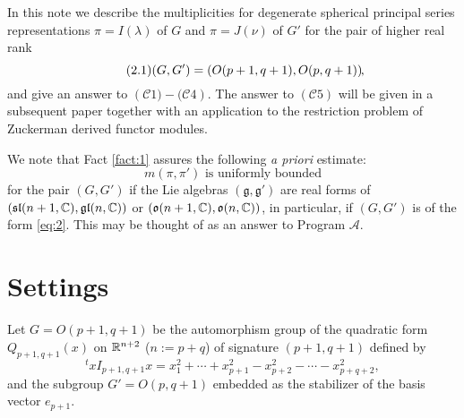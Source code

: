 \documentclass[reqno,12pt]{pja00} %
\theoremstyle{definition}
\theoremstyle{exampstyle} \newtheorem{examp}[theorem]{Theorem}
\newcommand{\tmtextbf}[1]{{\bfseries{#1}}}
\begin{document}

In this note we describe the multiplicities for degenerate spherical principal series representations $\pi=I(\lambda)$ of $G$ and $\pi=J(\nu)$ of $G'$ for the pair
of higher real rank\begin{equation}\tag{2.1}\label{eq:2}
	(G,G')=\left( O(p+1,q+1),O(p,q+1) \right)\kern-0.1cm,
\end{equation}
and give an answer to $\left( \mathcal{C}1)-(\mathcal{C}4 \right)$. The answer to $\left( \mathcal{C}5 \right)$ will be given
in a subsequent paper together with an application to the restriction problem of Zuckerman derived functor modules.

We note that Fact \ref{fact:1} assures the following {\it a priori} estimate:\begin{equation*}
	m(\pi,\pi')\mbox{ is uniformly bounded}
\end{equation*}
for the pair $(G,G')$ if the Lie algebras $(\mathfrak{g},\mathfrak{g}')$ are real forms of $(\mathfrak{sl}(n+1,\mathbb{C}),\mathfrak{gl}(n,\mathbb{C}))$
or $(\mathfrak{o}(n+1,\mathbb{C}),\mathfrak{o}(n,\mathbb{C}))$, in particular, if $(G,G')$ is of the form \eqref{eq:2}. This may be thought of as an answer to Program $\mathcal{A}$.
\section{Settings}
Let $G=O(p+1,q+1)$ be the automorphism group of the quadratic form
$Q_{p+1,q+1}(x)$ on $\mathbb{R}^{n+2}$ ($n:=p+q$) of signature $(p+1,q+1)$ defined by
\begin{equation*}
		^t\!xI_{p+1,q+1}x
		=x_1^2+\cdots+x_{p+1}^2-x_{p+2}^2-\cdots-x_{p+q+2}^2,
\end{equation*}
and the subgroup $G'=O(p,q+1)$ embedded as the stabilizer of the basis vector $e_{p+1}$.
\end{document}
